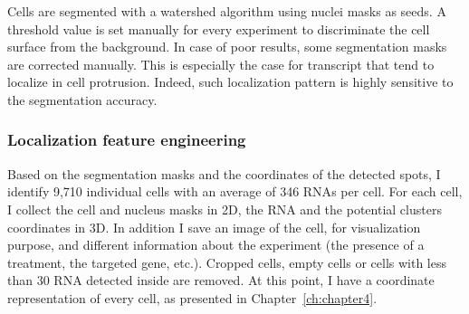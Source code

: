 Cells are segmented with a watershed algorithm using nuclei masks as seeds.
A threshold value is set manually for every experiment to discriminate the cell surface from the background.
In case of poor results, some segmentation masks are corrected manually.
This is especially the case for transcript that tend to localize in cell protrusion.
Indeed, such localization pattern is highly sensitive to the segmentation accuracy.

\subsubsection{Localization feature engineering}

Based on the segmentation masks and the coordinates of the detected spots, I identify 9,710 individual cells with an average of 346 \ac{RNA}s per cell.
For each cell, I collect the cell and nucleus masks in 2D, the \ac{RNA} and the potential clusters coordinates in 3D.
In addition I save an image of the cell, for visualization purpose, and different information about the experiment (the presence of a treatment, the targeted gene, etc.).
Cropped cells, empty cells or cells with less than 30 \ac{RNA} detected inside are removed.
At this point, I have a coordinate representation of every cell, as presented in Chapter~\ref{ch:chapter4}.

